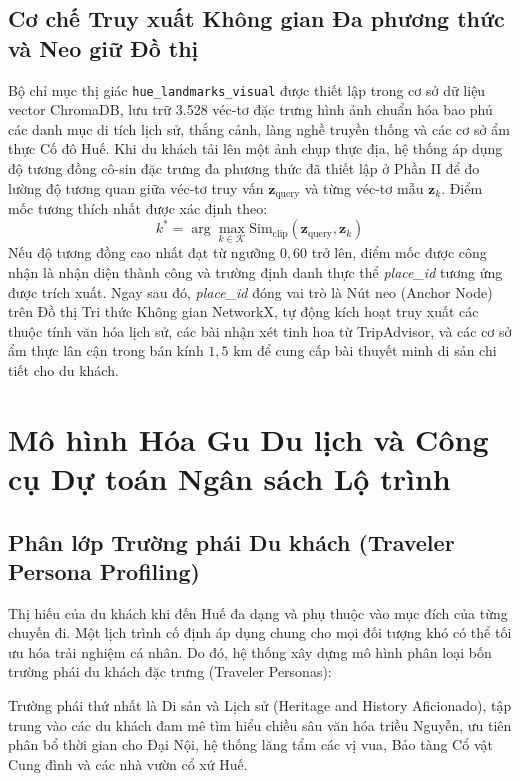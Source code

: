 \subsection{Cơ chế Truy xuất Không gian Đa phương thức và Neo giữ Đồ thị}
\label{subsec:ch1-visual-retrieval}

Bộ chỉ mục thị giác \texttt{hue\_landmarks\_visual} được thiết lập trong cơ sở dữ liệu vector ChromaDB, lưu trữ 3.528 véc-tơ đặc trưng hình ảnh chuẩn hóa bao phủ các danh mục di tích lịch sử, thắng cảnh, làng nghề truyền thống và các cơ sở ẩm thực Cố đô Huế. Khi du khách tải lên một ảnh chụp thực địa, hệ thống áp dụng độ tương đồng cô-sin đặc trưng đa phương thức đã thiết lập ở Phần II để đo lường độ tương quan giữa véc-tơ truy vấn $\mathbf{z}_{\text{query}}$ và từng véc-tơ mẫu $\mathbf{z}_k$. Điểm mốc tương thích nhất được xác định theo:
\begin{equation}
    k^* = \arg\max_{k \in \mathcal{K}} \text{Sim}_{\text{clip}}(\mathbf{z}_{\text{query}}, \mathbf{z}_k)
    \label{eq:top1-visual}
\end{equation}
Nếu độ tương đồng cao nhất đạt từ ngưỡng $0{,}60$ trở lên, điểm mốc được công nhận là nhận diện thành công và trường định danh thực thể \textit{place\_id} tương ứng được trích xuất. Ngay sau đó, \textit{place\_id} đóng vai trò là Nút neo (Anchor Node) trên Đồ thị Tri thức Không gian NetworkX, tự động kích hoạt truy xuất các thuộc tính văn hóa lịch sử, các bài nhận xét tinh hoa từ TripAdvisor, và các cơ sở ẩm thực lân cận trong bán kính $1{,}5\text{ km}$ để cung cấp bài thuyết minh di sản chi tiết cho du khách.

\section{Mô hình Hóa Gu Du lịch và Công cụ Dự toán Ngân sách Lộ trình}
\label{sec:ch1-budget-persona}

\subsection{Phân lớp Trường phái Du khách (Traveler Persona Profiling)}
\label{subsec:ch1-personas}

Thị hiếu của du khách khi đến Huế đa dạng và phụ thuộc vào mục đích của từng chuyến đi. Một lịch trình cố định áp dụng chung cho mọi đối tượng khó có thể tối ưu hóa trải nghiệm cá nhân. Do đó, hệ thống xây dựng mô hình phân loại bốn trường phái du khách đặc trưng (Traveler Personas):

Trường phái thứ nhất là Di sản và Lịch sử (Heritage and History Aficionado), tập trung vào các du khách đam mê tìm hiểu chiều sâu văn hóa triều Nguyễn, ưu tiên phân bổ thời gian cho Đại Nội, hệ thống lăng tẩm các vị vua, Bảo tàng Cổ vật Cung đình và các nhà vườn cổ xứ Huế.

